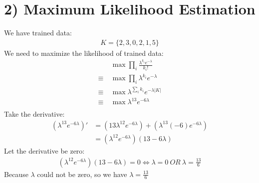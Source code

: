 \documentclass{article}
\begin{document}
\section*{2) Maximum Likelihood Estimation}
We have trained data: 
\begin{align*}
K = \{2, 3, 0, 2, 1, 5\}
\end{align*}
We need to maximize the likelihood of trained data:
\begin{align*}
& \max \prod\limits_i \frac{\lambda^{k_i}e^{-\lambda}}{k_i !}\\
\equiv \ & \max \prod\limits_i \lambda^{k_i}e^{-\lambda}\\
\equiv \ & \max \lambda^{\sum\limits_i k_i}e^{-\lambda |K|}\\
\equiv \ & \max \lambda^{13}e^{-6\lambda}\\
\end{align*}
Take the derivative:
\begin{align*}
(\lambda^{13}e^{-6\lambda})' &= (13\lambda^{12}e^{-6\lambda}) + (\lambda^{13}(-6)e^{-6\lambda})\\
&= (\lambda^{12}e^{-6\lambda})(13 - 6\lambda)
\end{align*}
Let the derivative be zero:
\begin{align*}
(\lambda^{12}e^{-6\lambda})(13 - 6\lambda) = 0 \iff \lambda = 0\ OR\ \lambda = \frac{13}{6}
\end{align*}
Because $\lambda$ could not be zero, so we have $\lambda = \frac{13}{6}$
\end{document}
